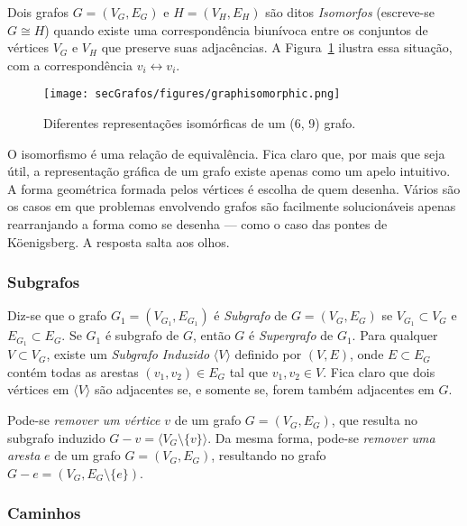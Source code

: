 Dois grafos $G = (V_G, E_G)$ e $H = (V_H, E_H)$ são ditos \textit{Isomorfos} (escreve-se $G \cong H$) quando existe uma correspondência biunívoca entre os conjuntos de vértices $V_G$ e $V_H$ que preserve suas adjacências. A Figura~\ref{fig:graphisomorphic} ilustra essa situação, com a correspondência $v_i \longleftrightarrow v_i$.

\begin{figure}[H]
	\begin{center}
		\texttt{[image: secGrafos/figures/graphisomorphic.png]}
	\end{center}
	\caption{Diferentes representações isomórficas de um (6, 9) grafo.}
	\label{fig:graphisomorphic}
\end{figure}

O isomorfismo é uma relação de equivalência. Fica claro que, por mais que seja útil, a representação gráfica de um grafo existe apenas como um apelo intuitivo. A forma geométrica formada pelos vértices é escolha de quem desenha. Vários são os casos em que problemas envolvendo grafos são facilmente solucionáveis apenas rearranjando a forma como se desenha --- como o caso das pontes de Köenigsberg. A resposta salta aos olhos.

\subsubsection{Subgrafos}

Diz-se que o grafo $G_1 = (V_{G_1}, E_{G_1})$ é \textit{Subgrafo} de $G = (V_G, E_G)$ se $V_{G_1} \subset V_G$ e $E_{G_1} \subset E_G$. Se $G_1$ é subgrafo de $G$, então $G$ é \textit{Supergrafo} de $G_1$. Para qualquer $V \subset V_G$, existe um \textit{Subgrafo Induzido} $\langle V \rangle$ definido por $(V, E)$, onde $E \subset E_G$ contém todas as arestas $(v_1, v_2) \in E_G$ tal que $v_1, v_2 \in V$. 
Fica claro que dois vértices em $\langle V \rangle$ são adjacentes se, e somente se, forem também adjacentes em $G$.

Pode-se \textit{remover um vértice} $v$ de um grafo $G = (V_G, E_G)$, que resulta no subgrafo induzido $G - v = \langle V_G \setminus \{v\}\rangle$. Da mesma forma, pode-se \textit{remover uma aresta} $e$ de um grafo $G = (V_G, E_G)$, resultando no grafo $G-e = (V_G, E_G \setminus \{e\})$.

\subsubsection{Caminhos}


